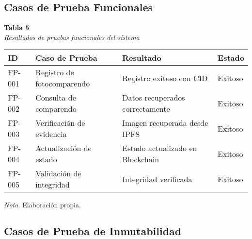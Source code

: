 
\subsection{Casos de Prueba Funcionales}

\begin{table}[htbp]
    \begin{flushleft}
        \textbf{Tabla 5}\\
        \textit{Resultados de pruebas funcionales del sistema}
    \end{flushleft}
    \centering
    \begin{tabular}{|p{2cm}|p{4cm}|p{3cm}|p{3cm}|}
    \hline
    \textbf{ID} & \textbf{Caso de Prueba} & \textbf{Resultado} & \textbf{Estado} \\
    \hline
    FP-001 & Registro de fotocomparendo & Registro exitoso con CID & Exitoso \\
    \hline
    FP-002 & Consulta de comparendo & Datos recuperados correctamente & Exitoso \\
    \hline
    FP-003 & Verificación de evidencia & Imagen recuperada desde IPFS & Exitoso \\
    \hline
    FP-004 & Actualización de estado & Estado actualizado en Blockchain & Exitoso \\
    \hline
    FP-005 & Validación de integridad & Integridad verificada & Exitoso \\
    \hline
    \end{tabular}
    \vspace{0.5em}
    \begin{flushleft}
        \textit{Nota.} Elaboración propia.
    \end{flushleft}
    \label{tab:resultados_funcionales}
\end{table}

\subsection{Casos de Prueba de Inmutabilidad}

